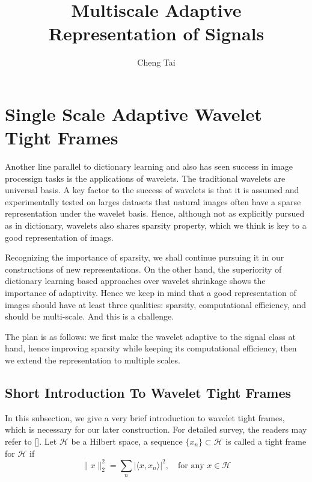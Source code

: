 \documentclass[a4paper]{article}
\begin{document}
\newtheorem{lem}{Lemma}
\title{Multiscale Adaptive Representation of Signals}
\author{Cheng Tai}
\date{}
\maketitle
{}

\newpage
{{\color{cyan}
\section{Single Scale Adaptive Wavelet Tight Frames}
Another line parallel to dictionary learning and also has seen success in image processign tasks is the applications of wavelets. The traditional wavelets are universal basis. A key factor to the success of wavelets is that it is assumed and experimentally tested on larges datasets that natural images often have a sparse representation under the wavelet basis. Hence, although not as explicitly pursued as in dictionary, wavelets also shares sparsity property, which we think is key to a good representation of imags.

Recognizing the importance of sparsity, we shall continue pursuing it in our constructions of new representations. On the other hand, the superiority of dictionary learning based approaches over wavelet shrinkage shows the importance of adaptivity. Hence we keep in mind that a good representation of images should have at least three qualities: sparsity, computational efficiency, and should be multi-scale. And this is a challenge.

The plan is as follows: we first make the wavelet adaptive to the signal class at hand, hence improving sparsity while keeping its computational efficiency, then we extend the representation to multiple scales.

\subsection{Short Introduction To Wavelet Tight Frames}
In this subsection, we give a very brief introduction to wavelet tight frames, which is necessary for our later construction. For detailed survey, the readers may refer to []. Let $\mathcal{H}$ be a Hilbert space, a sequence $\{x_n\}\subset \mathcal{H}$ is called a tight frame for $\mathcal{H}$ if 
\[
	\|x\|_2^2 = \sum_n |\langle x,x_n\rangle |^2, \quad \textrm{for any } x\in \mathcal{H}
\]

}}
\end{document}
